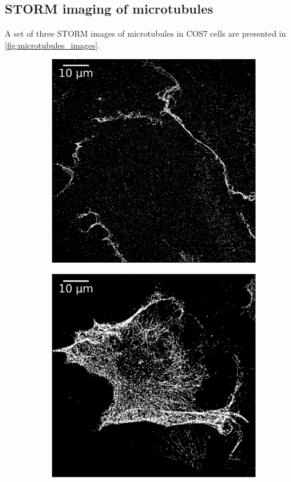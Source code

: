 \subsection{STORM imaging of microtubules} \label{sec:results_microtubules}
A set of three STORM images of microtubules in COS7 cells are presented in \autoref{fig:microtubules_images}.
%
\begin{figure}
    \begin{subfigure}{0.32\textwidth}
        \includegraphics[width=\textwidth]{figures/microtubules_image1.png}
        \caption{}
        \label{fig:microtubules_image1}
    \end{subfigure}
    \begin{subfigure}{0.32\textwidth}
        \includegraphics[width=\textwidth]{figures/microtubules_image4.png}

\end{subfigure}
\end{figure}

